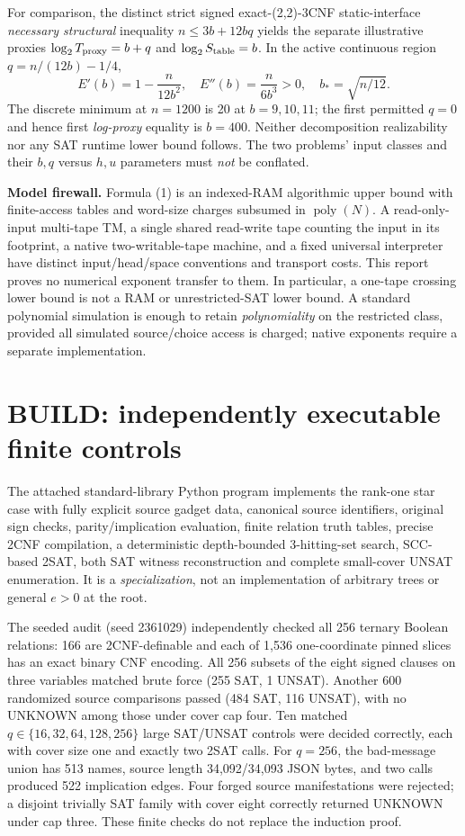 \documentclass[10pt]{article}
\newcommand{\poly}{\operatorname{poly}}
\begin{document}
For comparison, the distinct strict signed exact-(2,2)-3CNF static-interface \emph{necessary structural} inequality $n\le3b+12bq$ yields the separate illustrative proxies $\log_2T_{\rm proxy}=b+q$ and $\log_2S_{\rm table}=b$. In the active continuous region $q=n/(12b)-1/4$,
\[
 E'(b)=1-\frac{n}{12b^2},\quad
 E''(b)=\frac{n}{6b^3}>0,\quad
 b_*=\sqrt{n/12}.
\]
The discrete minimum at $n=1200$ is 20 at $b=9,10,11$; the first permitted $q=0$ and hence first \emph{log-proxy} equality is $b=400$. Neither decomposition realizability nor any SAT runtime lower bound follows. The two problems' input classes and their $b,q$ versus $h,u$ parameters must \emph{not} be conflated.

\noindent\textbf{Model firewall.} Formula (1) is an indexed-RAM algorithmic upper bound with finite-access tables and word-size charges subsumed in $\poly(N)$. A read-only-input multi-tape TM, a single shared read-write tape counting the input in its footprint, a native two-writable-tape machine, and a fixed universal interpreter have distinct input/head/space conventions and transport costs. This report proves no numerical exponent transfer to them. In particular, a one-tape crossing lower bound is not a RAM or unrestricted-SAT lower bound. A standard polynomial simulation is enough to retain \emph{polynomiality} on the restricted class, provided all simulated source/choice access is charged; native exponents require a separate implementation.

\section{BUILD: independently executable finite controls}
The attached standard-library Python program  implements the rank-one star case with fully explicit source gadget data, canonical source identifiers, original sign checks, parity/implication evaluation, finite relation truth tables, precise 2CNF compilation, a deterministic depth-bounded 3-hitting-set search, SCC-based 2SAT, both SAT witness reconstruction and complete small-cover UNSAT enumeration. It is a \emph{specialization}, not an implementation of arbitrary trees or general $e>0$ at the root.

The seeded audit (seed 2361029) independently checked all 256 ternary Boolean relations: 166 are 2CNF-definable and each of 1,536 one-coordinate pinned slices has an exact binary CNF encoding. All 256 subsets of the eight signed clauses on three variables matched brute force (255 SAT, 1 UNSAT). Another 600 randomized source comparisons passed (484 SAT, 116 UNSAT), with no UNKNOWN among those under cover cap four. Ten matched $q\in\{16,32,64,128,256\}$ large SAT/UNSAT controls were decided correctly, each with cover size one and exactly two 2SAT calls. For $q=256$, the bad-message union has 513 names, source length 34,092/34,093 JSON bytes, and two calls produced 522 implication edges. Four forged source manifestations were rejected; a disjoint trivially SAT family with cover eight correctly returned UNKNOWN under cap three. These finite checks do not replace the induction proof.
\end{document}
